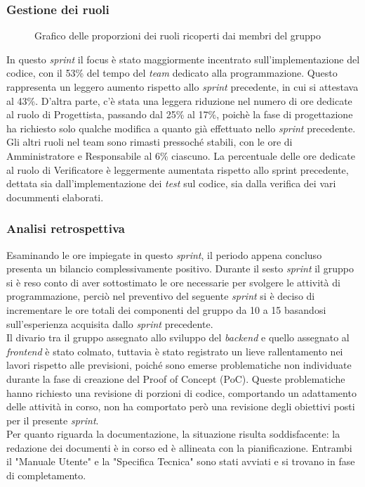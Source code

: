 \subsubsection{Gestione dei ruoli}
\begin{figure}[h]
	\centering
	\caption{Grafico delle proporzioni dei ruoli ricoperti dai membri del gruppo}
\end{figure}

In questo \textit{sprint} il focus è stato maggiormente incentrato sull'implementazione del codice, con il 53\% del tempo del \textit{team} dedicato alla programmazione. Questo rappresenta un leggero aumento rispetto allo \textit{sprint} precedente, in cui si attestava al 43\%.
D'altra parte, c'è stata una leggera riduzione nel numero di ore dedicate al ruolo di Progettista, passando dal 25\% al 17\%, poichè la fase di progettazione ha richiesto solo qualche modifica a quanto già effettuato nello \textit{sprint} precedente.
Gli altri ruoli nel team sono rimasti pressoché stabili, con le ore di Amministratore e Responsabile al 6\% ciascuno.
La percentuale delle ore dedicate al ruolo di Verificatore è leggermente aumentata rispetto allo sprint precedente, dettata sia dall'implementazione dei \textit{test} sul codice, sia dalla verifica dei vari docummenti elaborati.

\subsubsection{Analisi retrospettiva}
Esaminando le ore impiegate in questo \textit{sprint}, il periodo appena concluso presenta un bilancio complessivamente positivo. Durante il sesto \textit{sprint} il gruppo si è reso conto di aver sottostimato le ore necessarie per svolgere le attività di programmazione, perciò nel preventivo del seguente \textit{sprint} si è deciso di incrementare le ore totali dei componenti del gruppo da 10 a 15 basandosi sull'esperienza acquisita dallo \textit{sprint} precedente.\\
Il divario tra il gruppo assegnato allo sviluppo del \textit{backend} e quello assegnato al \textit{frontend} è stato colmato, tuttavia è stato registrato un lieve rallentamento nei lavori rispetto alle previsioni, poiché sono emerse problematiche non individuate durante la fase di creazione del Proof of Concept (PoC). Queste problematiche hanno richiesto una revisione di porzioni di codice, comportando un adattamento delle attività in corso, non ha comportato però una revisione degli obiettivi posti per il presente \textit{sprint}.\\
Per quanto riguarda la documentazione, la situazione risulta soddisfacente: la redazione dei documenti è in corso ed è allineata con la pianificazione. Entrambi il "Manuale Utente" e la "Specifica Tecnica" sono stati avviati e si trovano in fase di completamento.

